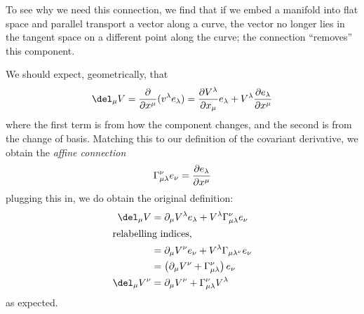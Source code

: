 To see why we need this connection, we find that if we embed a manifold into flat space and parallel transport a vector along a curve, the vector no longer lies in the tangent space on a different point along the curve; the connection ``removes'' this component.

We should expect, geometrically, that
\[\del_\mu V = \pder{}{x^\mu}(v^\lambda e_\lambda) = \pder{V^\lambda}{x_\mu}e_\lambda + V^\lambda \pder{e_\lambda}{x^\mu}\]
where the first term is from how the component changes, and the second is from the change of basis. Matching this to our definition of the covariant derivative, we obtain the \emph{affine connection}
\[\Gamma_{\mu\lambda}^\nu e_\nu = \frac{\partial e_\lambda}{\partial x^\mu}\]
plugging this in, we do obtain the original definition:
\begin{align*}
	\del_\mu V&=\partial_\mu V^\lambda e_\lambda + V^\lambda \Gamma_{\mu\lambda}^\nu e_\nu\\
	\intertext{relabelling indices,}
		  &=\partial_\mu V^\nu e_\nu + V^\lambda\Gamma_{\mu\lambda^\nu}e_\nu\\
		  &=\left(\partial_\mu V^\nu + \Gamma_{\mu\lambda}^\nu\right)e_\nu\\
	\del_\mu V^\nu &= \partial_\mu V^\nu + \Gamma_{\mu\lambda}^\nu V^\lambda
\end{align*}
as expected.

